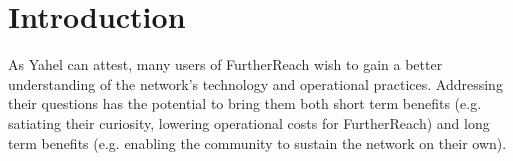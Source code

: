 \section{Introduction}
\label{sec:introduction}

As Yahel can attest, many users of FurtherReach wish to gain a better
understanding of the network’s technology and operational practices. Addressing
their questions has the potential to bring them both short term benefits
(e.g. satiating their curiosity, lowering operational costs for FurtherReach)
and long term benefits (e.g. enabling the community to sustain the network on
their own).


